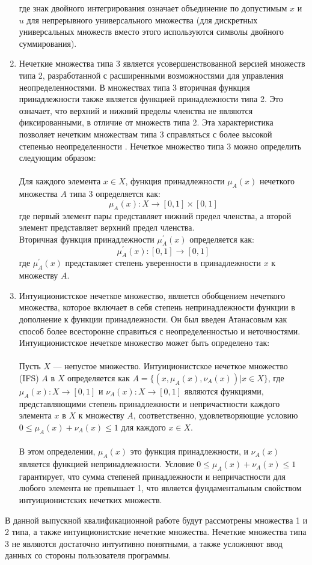 \documentclass{article}
\begin{document}
\begin{enumerate}
        где знак двойного интегрирования означает объединение по допустимым $x$ и $u$ для непрерывного универсального множества (для дискретных универсальных множеств вместо этого используются символы двойного суммирования).
        \item Нечеткие множества типа 3 является усовершенствованной версией множеств типа 2, разработанной с расширенными возможностями для управления неопределенностями. В множествах типа 3 вторичная функция принадлежности также является функцией принадлежности типа 2. Это означает, что верхний и нижний пределы членства не являются фиксированными, в отличие от множеств типа 2. Эта характеристика позволяет нечетким множествам типа 3 справляться с более высокой степенью неопределенности \cite{litlink22}. Нечеткое множество типа 3 можно определить следующим образом:\\
        ~\\
        Для каждого элемента \(x \in X\), функция принадлежности \(\mu_{A}(x)\) нечеткого множества \(A\) типа 3 определяется как:\\
        \[\mu_{A}(x) : X \rightarrow [0,1] \times [0,1]\]
        где первый элемент пары представляет нижний предел членства, а второй элемент представляет верхний предел членства.\\
        Вторичная функция принадлежности \(\mu_{A}^{'}(x)\) определяется как:\\
        \[\mu_{A}^{'}(x) : [0,1] \rightarrow [0,1]\]
        где \(\mu_{A}^{'}(x)\) представляет степень уверенности в принадлежности \(x\) к множеству \(A\).
        \item Интуиционистское нечеткое множество, является обобщением нечеткого множества, которое включает в себя степень непринадлежности функции в дополнение к функции принадлежности. Он был введен Атанасовым как способ более всесторонне справиться с неопределенностью и неточностями. Интуиционистское нечеткое множество может быть определено так:\\
        ~\\
        Пусть $X$ — непустое множество. Интуиционистское нечеткое множество (IFS) $A$ в $X$ определяется как $A = \{(x, \mu_A(x), \nu_A(x)) | x \in X\}$, где $\mu_A(x): X \rightarrow [0,1]$ и $\nu_A(x): X \rightarrow [0,1]$ являются функциями, представляющими степень принадлежности и непричастности каждого элемента $x$ в $X$ к множеству $A$, соответственно, удовлетворяющие условию $0 \leq \mu_A(x) + \nu_A(x) \leq 1$ для каждого $x \in X$.\\
        ~\\
        В этом определении, $\mu_A(x)$ это функция принадлежности, и $\nu_A(x)$ является функцией непринадлежности. Условие $0 \leq \mu_A(x) + \nu_A(x) \leq 1$ гарантирует, что сумма степеней принадлежности и непричастности для любого элемента не превышает 1, что является фундаментальным свойством интуиционистских нечетких множеств.\\
    \end{enumerate}
    В данной выпускной квалификационной работе будут рассмотрены множества 1 и 2 типа, а также интуиционистские нечеткие множества. Нечеткие множества типа 3 не являются достаточно интуитивно понятными, а также усложняют ввод данных со стороны пользователя программы.
\end{document}
